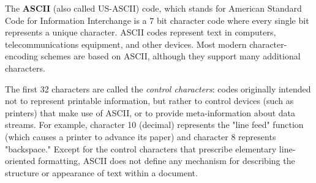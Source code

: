     \begin{definition}[ASCII]
      The \textbf{ASCII} (also called US-ASCII) code, which stands for American Standard Code for Information Interchange is a $7$ bit character code where every single bit represents a unique character. ASCII codes represent text in computers, telecommunications equipment, and other devices. Most modern character-encoding schemes are based on ASCII, although they support many additional characters.

      The first 32 characters are called the \textit{control characters}: codes originally intended not to represent printable information, but rather to control devices (such as printers) that make use of ASCII, or to provide meta-information about data streams. For example, character 10 (decimal) represents the "line feed" function (which causes a printer to advance its paper) and character 8 represents "backspace." Except for the control characters that prescribe elementary line-oriented formatting, ASCII does not define any mechanism for describing the structure or appearance of text within a document. 
      \begin{center}
\end{center}
\end{definition}
